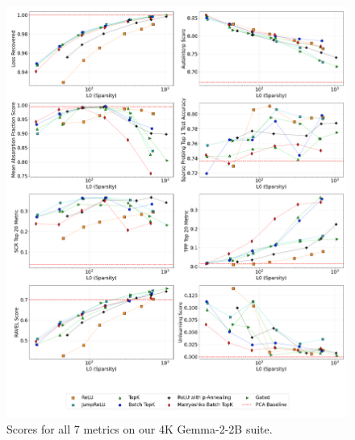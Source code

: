 \documentclass{article}
\theoremstyle{plain}
\theoremstyle{definition}
\theoremstyle{remark}
\begin{document}
\begin{figure}[h!]
    \centering
    \includegraphics[width=\columnwidth]{images/plot_2x4_sae_bench_gemma-2-2b_4k_architecture_series_layer_12.png}
    \caption{Scores for all 7 metrics on our 4K Gemma-2-2B suite.}
\end{figure}
\label{fig:plot_2x4_sae_bench_gemma-2-2b_4k_architecture_series_layer_12}
\end{document}
